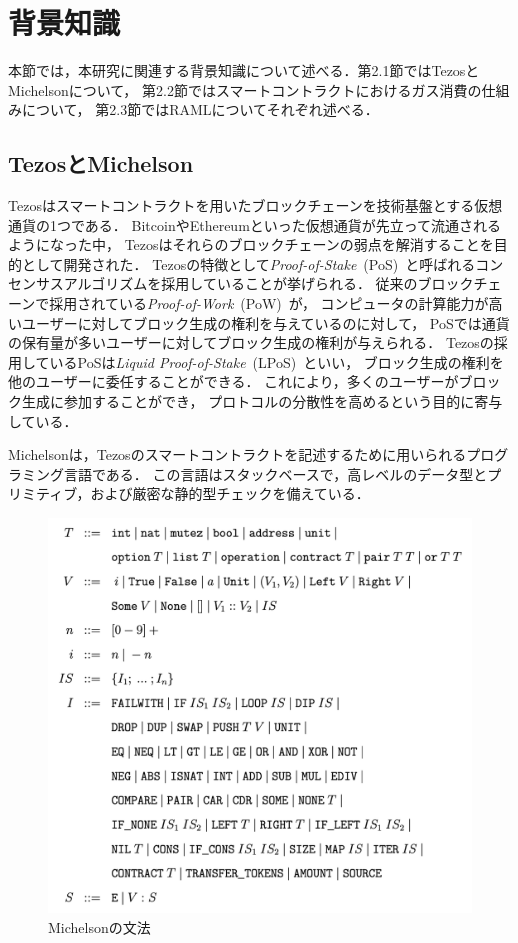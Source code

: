 \documentclass{kuisthesis}
\begin{document}
\section{背景知識}\label{sec-preliminary}
本節では，本研究に関連する背景知識について述べる．第2.1節ではTezosとMichelsonについて，
第2.2節ではスマートコントラクトにおけるガス消費の仕組みについて，
第2.3節ではRAMLについてそれぞれ述べる．

\subsection{TezosとMichelson}\label{subsec-pre-tezos}
Tezosはスマートコントラクトを用いたブロックチェーンを技術基盤とする仮想通貨の1つである．
BitcoinやEthereumといった仮想通貨が先立って流通されるようになった中，
Tezosはそれらのブロックチェーンの弱点を解消することを目的として開発された\cite{tezos}．
Tezosの特徴として\emph{Proof-of-Stake}\ (PoS)\ と呼ばれるコンセンサスアルゴリズムを採用していることが挙げられる．
従来のブロックチェーンで採用されている\emph{Proof-of-Work}\ (PoW)\ が，
コンピュータの計算能力が高いユーザーに対してブロック生成の権利を与えているのに対して，
PoSでは通貨の保有量が多いユーザーに対してブロック生成の権利が与えられる．
Tezosの採用しているPoSは\emph{Liquid Proof-of-Stake}\ (LPoS)\ といい，
ブロック生成の権利を他のユーザーに委任することができる．
これにより，多くのユーザーがブロック生成に参加することができ，
プロトコルの分散性を高めるという目的に寄与している．

 Michelsonは，Tezosのスマートコントラクトを記述するために用いられるプログラミング言語である．
この言語はスタックベースで，高レベルのデータ型とプリミティブ，および厳密な静的型チェックを備えている\cite{michelson}．


\begin{figure}[ht]
  \begin{center}
    \includegraphics[scale=0.75]{image1.png}
    \caption{Michelsonの文法}
    \label{image1}
  \end{center}
\end{figure}
\end{document}
